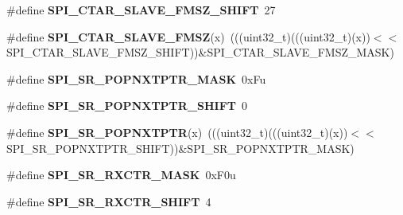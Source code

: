 \begin{DoxyCompactItemize}
\item 
\#define {\bfseries S\+P\+I\+\_\+\+C\+T\+A\+R\+\_\+\+S\+L\+A\+V\+E\+\_\+\+F\+M\+S\+Z\+\_\+\+S\+H\+I\+FT}~27\hypertarget{group__SPI__Register__Masks_gaf8ee524100dedae1cc3afb60643b2475}{}\label{group__SPI__Register__Masks_gaf8ee524100dedae1cc3afb60643b2475}

\item 
\#define {\bfseries S\+P\+I\+\_\+\+C\+T\+A\+R\+\_\+\+S\+L\+A\+V\+E\+\_\+\+F\+M\+SZ}(x)~(((uint32\+\_\+t)(((uint32\+\_\+t)(x))$<$$<$S\+P\+I\+\_\+\+C\+T\+A\+R\+\_\+\+S\+L\+A\+V\+E\+\_\+\+F\+M\+S\+Z\+\_\+\+S\+H\+I\+FT))\&S\+P\+I\+\_\+\+C\+T\+A\+R\+\_\+\+S\+L\+A\+V\+E\+\_\+\+F\+M\+S\+Z\+\_\+\+M\+A\+SK)\hypertarget{group__SPI__Register__Masks_ga20fc13a457a7df6331fdfdcbbc89c972}{}\label{group__SPI__Register__Masks_ga20fc13a457a7df6331fdfdcbbc89c972}

\item 
\#define {\bfseries S\+P\+I\+\_\+\+S\+R\+\_\+\+P\+O\+P\+N\+X\+T\+P\+T\+R\+\_\+\+M\+A\+SK}~0x\+Fu\hypertarget{group__SPI__Register__Masks_gabf0bcd5a32bcc6e58bac1a0f826ab3c6}{}\label{group__SPI__Register__Masks_gabf0bcd5a32bcc6e58bac1a0f826ab3c6}

\item 
\#define {\bfseries S\+P\+I\+\_\+\+S\+R\+\_\+\+P\+O\+P\+N\+X\+T\+P\+T\+R\+\_\+\+S\+H\+I\+FT}~0\hypertarget{group__SPI__Register__Masks_gac1f2a81bf6d8b44020db098097c74964}{}\label{group__SPI__Register__Masks_gac1f2a81bf6d8b44020db098097c74964}

\item 
\#define {\bfseries S\+P\+I\+\_\+\+S\+R\+\_\+\+P\+O\+P\+N\+X\+T\+P\+TR}(x)~(((uint32\+\_\+t)(((uint32\+\_\+t)(x))$<$$<$S\+P\+I\+\_\+\+S\+R\+\_\+\+P\+O\+P\+N\+X\+T\+P\+T\+R\+\_\+\+S\+H\+I\+FT))\&S\+P\+I\+\_\+\+S\+R\+\_\+\+P\+O\+P\+N\+X\+T\+P\+T\+R\+\_\+\+M\+A\+SK)\hypertarget{group__SPI__Register__Masks_ga7524dc6520cf5bcea82f6d62db3a5ee8}{}\label{group__SPI__Register__Masks_ga7524dc6520cf5bcea82f6d62db3a5ee8}

\item 
\#define {\bfseries S\+P\+I\+\_\+\+S\+R\+\_\+\+R\+X\+C\+T\+R\+\_\+\+M\+A\+SK}~0x\+F0u\hypertarget{group__SPI__Register__Masks_gad70ca8db9ba4e1d62e081ef648d84752}{}\label{group__SPI__Register__Masks_gad70ca8db9ba4e1d62e081ef648d84752}

\item 
\#define {\bfseries S\+P\+I\+\_\+\+S\+R\+\_\+\+R\+X\+C\+T\+R\+\_\+\+S\+H\+I\+FT}~4\hypertarget{group__SPI__Register__Masks_gacd499785f654eb1b4d1ced2bf0b2e7ac}{}\label{group__SPI__Register__Masks_gacd499785f654eb1b4d1ced2bf0b2e7ac}


\end{DoxyCompactItemize}
